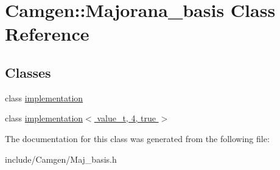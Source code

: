 \hypertarget{a00340}{}\section{Camgen\+:\+:Majorana\+\_\+basis Class Reference}
\label{a00340}
\subsection*{Classes}
\begin{DoxyCompactItemize}
\item 
class \hyperlink{a00295}{implementation}
\item 
class \hyperlink{a00306}{implementation$<$ value\+\_\+t, 4, true $>$}
\end{DoxyCompactItemize}


The documentation for this class was generated from the following file\+:\begin{DoxyCompactItemize}
\item 
include/\+Camgen/Maj\+\_\+basis.\+h\end{DoxyCompactItemize}
